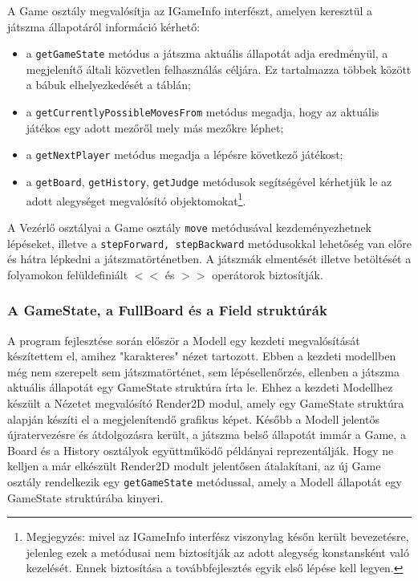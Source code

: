 \documentclass[12pt, twoside]{report}
\begin{document}
A Game osztály megvalósítja az IGameInfo interfészt, amelyen keresztül a játszma állapotáról információ kérhető:
\begin{itemize}
	\item a {\tt getGameState} metódus a játszma aktuális állapotát adja eredményül, a megjelenítő általi közvetlen felhasználás céljára. Ez tartalmazza többek között a bábuk elhelyezkedését a táblán;
	\item a {\tt getCurrentlyPossibleMovesFrom} metódus megadja, hogy az aktuális játékos egy adott mezőről mely más mezőkre léphet;
	\item a {\tt getNextPlayer} metódus megadja a lépésre következő játékost;
	\item a {\tt getBoard}, {\tt getHistory}, {\tt getJudge} metódusok segítségével kérhetjük le az adott alegységet megvalósító objektomokat\footnote{Megjegyzés: mivel az IGameInfo interfész viszonylag későn került bevezetésre, jelenleg ezek a metódusai nem biztosítják az adott alegység konstansként való kezelését. Ennek biztosítása a továbbfejlesztés egyik első lépése kell legyen.}.
\end{itemize}

A Vezérlő osztályai a Game osztály {\tt move} metódusával kezdeményezhetnek lépéseket, illetve a {\tt stepForward, stepBackward} metódusokkal lehetőség van előre és hátra lépkedni a játszmatörténetben. A játszmák elmentését illetve betöltését a folyamokon felüldefiniált $<<$ és $>>$ operátorok biztosítják.

\subsubsection{A GameState, a FullBoard és a Field struktúrák}

A program fejlesztése során először a Modell egy kezdeti megvalósítását készítettem el, amihez "karakteres" nézet tartozott. Ebben a kezdeti modellben még nem szerepelt sem játszmatörténet, sem lépésellenőrzés, ellenben a játszma aktuális állapotát egy GameState struktúra írta le. Ehhez a kezdeti Modellhez készült a Nézetet megvalósító Render2D modul, amely egy GameState struktúra alapján készíti el a megjelenítendő grafikus képet. Később a Modell jelentős újratervezésre és átdolgozásra került, a játszma belső állapotát immár a Game, a Board és a History osztályok együttműködő példányai reprezentálják. Hogy ne kelljen a már elkészült Render2D modult jelentősen átalakítani, az új Game osztály rendelkezik egy {\tt getGameState} metódussal, amely a Modell állapotát egy GameState struktúrába kinyeri.
\end{document}
